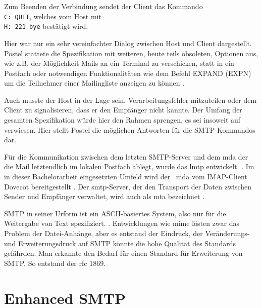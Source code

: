 Zum Beenden der Verbindung sendet der Client das Kommando \\
\verb+C: QUIT+, welches vom Host mit \\
\verb+H: 221 bye+ bestätigt wird. 

Hier war nur ein sehr vereinfachter Dialog zwischen Host und Client dargestellt. Postel stattete die Spezifikation mit weiteren, heute teils obsoleten, Optionen aus, wie z.B. der Möglichkeit Mails an ein Terminal zu verschicken, statt in ein Postfach \citep[vgl.][11]{rfc821} oder notwendigen Funktionalitäten wie dem Befehl EXPAND (EXPN) um die Teilnehmer einer Mailingliste anzeigen zu können \citep[vgl.][8]{rfc821}.

Auch musste der Host in der Lage sein, Verarbeitungsfehler mitzuteilen oder dem Client zu signalisieren, dass er den Empfänger nicht kannte. Der Umfang der gesamten Spezifikation würde hier den Rahmen sprengen, es sei insoweit auf \cite[][S. 37 ff.]{rfc821} verwiesen. Hier stellt Postel die möglichen Antworten für die SMTP-Kommandos dar.

Für die Kommunikation zwischen dem letzten SMTP-Server und dem \ac{mda} \citep[vgl.][28]{Heinlein2004} der die Mail letztendlich im lokalen Postfach ablegt, wurde das \ac{lmtp} entwickelt.  \citep[][39]{Heinlein2004}. Im in dieser Bachelorarbeit eingesetzten Umfeld wird der  \ac{mda} vom IMAP-Client Dovecot bereitgestellt \citep[vgl.][]{dovecotlmtp}. Der \ac{smtp}-Server, der den Transport der Daten zwischen Sender und Empfänger verwaltet, wird auch als \ac{mta} bezeichnet \citep[vgl.][28]{Heinlein2004}.

SMTP in seiner Urform ist ein ASCII-basiertes System, also nur für die Weitergabe von Text spezifiziert. \citep[][21]{rfc821}. Entwicklungen wie \ac{mime} \citep[vgl.][]{rfc1521} lösten zwar das Problem der Datei-Anhänge, aber es entstand der Eindruck, der Veränderungs- und Erweiterungsdruck auf SMTP könnte die hohe Qualität des Standards gefährden. Man erkannte den Bedarf für einen Standard für Erweiterung von SMTP. So entstand der \ac{rfc} 1869.

\section{Enhanced SMTP}

